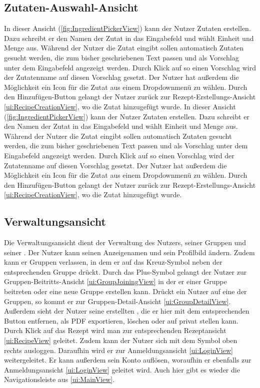 \documentclass[parskip=full]{scrartcl}
\begin{document}
\subsection{Zutaten-Auswahl-Ansicht}
\label{ui:IngredientPickerView}
In dieser Ansicht (\autoref{fig:IngredientPickerView}) kann der Nutzer Zutaten erstellen. Dazu schreibt er den Namen der Zutat in das Eingabefeld und wählt Einheit und Menge aus. Während der Nutzer die Zutat eingibt sollen automatisch Zutaten gesucht werden, die zum bisher geschriebenen Text passen und als Vorschlag unter dem Eingabefeld angezeigt werden. Durch Klick auf so einen Vorschlag wird der Zutatenname auf diesen Vorschlag gesetzt. Der Nutzer hat außerdem die Möglichkeit ein Icon für die Zutat aus einem Dropdownmenü zu wählen. Durch den Hinzufügen-Button gelangt der Nutzer zurück zur Rezept-Erstellungs-Ansicht \ref{ui:RecipeCreationView}, wo die Zutat hinzugefügt wurde.
In dieser Ansicht (\autoref{fig:IngredientPickerView}) kann der Nutzer Zutaten erstellen. Dazu schreibt er den Namen der Zutat in das Eingabefeld und wählt Einheit und Menge aus. Während der Nutzer die Zutat eingibt sollen automatisch Zutaten gesucht werden, die zum bisher geschriebenen Text passen und als Vorschlag unter dem Eingabefeld angezeigt werden. Durch Klick auf so einen Vorschlag wird der Zutatenname auf diesen Vorschlag gesetzt. Der Nutzer hat außerdem die Möglichkeit ein Icon für die Zutat aus einem Dropdownmenü zu wählen. Durch den Hinzufügen-Button gelangt der Nutzer zurück zur Rezept-Erstellungs-Ansicht \ref{ui:RecipeCreationView}, wo die Zutat hinzugefügt wurde.


\subsection{Verwaltungsansicht}
\label{ui:SettingsView}
Die Verwaltungsansicht dient der Verwaltung des Nutzers, seiner Gruppen und seiner . Der Nutzer kann seinen Anzeigenamen und sein Profilbild ändern. Zudem kann er Gruppen verlassen, in dem er auf das Kreuz-Symbol neben der entsprechenden Gruppe drückt. Durch das Plus-Symbol gelangt der Nutzer zur Gruppen-Beitritts-Ansicht \ref{ui:GroupJoiningView} in der er einer Gruppe beitreten oder eine neue Gruppe erstellen kann. Drückt ein Nutzer auf eine der Gruppen, so kommt er zur Gruppen-Detail-Ansicht \ref{ui:GroupDetailView}. Außerdem sieht der Nutzer seine erstellten , die er hier mit dem entsprechenden Button entfernen, als PDF exportieren, löschen oder auf \gls{privat} stellen kann. Durch Klick auf das Rezept wird man zur entsprechenden Rezeptansicht \ref{ui:RecipeView} geleitet.
Zudem kann der Nutzer sich mit dem Symbol oben rechts ausloggen. Daraufhin wird er zur Anmeldungsansicht \ref{ui:LoginView} weitergeleitet. Er kann außerdem sein Konto auflösen, woraufhin er ebenfalls zur Anmeldungsansicht \ref{ui:LoginView} geleitet wird. Auch hier gibt es wieder die Navigationsleiste aus \ref{ui:MainView}.
\end{document}
